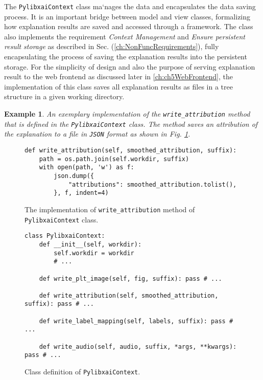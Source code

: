\documentclass[
    bindingoffset=5mm,  %
    footnoteindent=3mm, %
    hyphenation=true    %
]{src/wut-thesis}
\newtheorem{example}{Example}
\begin{document}
The \texttt{PylibxaiContext} class ma`nages the data and encapsulates the data saving process.
It is an important bridge between model and view classes, formalizing how explanation results
are saved and accessed through a framework.
The class also implements the requirement \textit{Context Management}
and \textit{Ensure persistent result storage} as described
in Sec. (\ref{ch:NonFuncRequirements}), fully encapsulating the process of
saving the explanation results into the persistent storage. For the simplicity of design and also the purpose of serving
explanation result to the web frontend as discussed later in \ref{ch:ch5WebFrontend},
the implementation of this class saves all explanation results as files in a tree structure in a given working directory.

\begin{example}
    An exemplary implementation of the \texttt{write\_attribution} method that is defined in the
    \texttt{PylibxaiContext} class. The method saves an attribution of the explanation to a file in \texttt{JSON} format
    as shown in Fig. \ref{fig:WriteAttributionMethod}.
\end{example}

\begin{figure}%
\begin{verbatim}
def write_attribution(self, smoothed_attribution, suffix):
    path = os.path.join(self.workdir, suffix)
    with open(path, 'w') as f:
        json.dump({
            "attributions": smoothed_attribution.tolist(),
        }, f, indent=4)
\end{verbatim}
\caption{The implementation of \texttt{write\_attribution} method of \texttt{PylibxaiContext} class.}
\label{fig:WriteAttributionMethod}
\end{figure}

\begin{figure}%
\begin{verbatim}
class PylibxaiContext:
    def __init__(self, workdir):
        self.workdir = workdir
        # ...
    
    def write_plt_image(self, fig, suffix): pass # ...
    
    def write_attribution(self, smoothed_attribution, suffix): pass # ...

    def write_label_mapping(self, labels, suffix): pass # ...
    
    def write_audio(self, audio, suffix, *args, **kwargs): pass # ...
\end{verbatim}
\caption{Class definition of \texttt{PylibxaiContext}.}
\label{fig:PylibxaiContext}
\end{figure}
\end{document}
